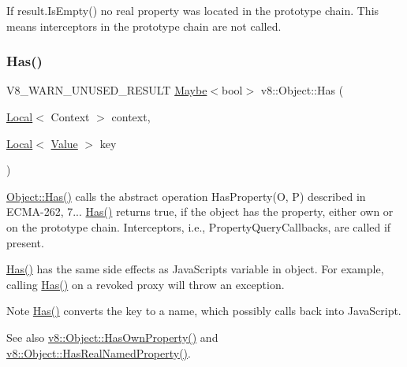 If result.\+Is\+Empty() no real property was located in the prototype chain. This means interceptors in the prototype chain are not called. \mbox{\label{classv8_1_1Object_a57d4819c2cc13715ed22dd23cdc84d7c}} 
\subsubsection{\texorpdfstring{Has()}{Has()}}
{\footnotesize\ttfamily V8\+\_\+\+W\+A\+R\+N\+\_\+\+U\+N\+U\+S\+E\+D\+\_\+\+R\+E\+S\+U\+LT \mbox{\hyperlink{classv8_1_1Maybe}{Maybe}}$<$bool$>$ v8\+::\+Object\+::\+Has (\begin{DoxyParamCaption}\item[{\mbox{\hyperlink{classv8_1_1Local}{Local}}$<$ Context $>$}]{context,  }\item[{\mbox{\hyperlink{classv8_1_1Local}{Local}}$<$ \mbox{\hyperlink{classv8_1_1Value}{Value}} $>$}]{key }\end{DoxyParamCaption})}

\mbox{\hyperlink{classv8_1_1Object_a57d4819c2cc13715ed22dd23cdc84d7c}{Object\+::\+Has()}} calls the abstract operation Has\+Property(\+O, P) described in E\+C\+M\+A-\/262, 7... \mbox{\hyperlink{classv8_1_1Object_a57d4819c2cc13715ed22dd23cdc84d7c}{Has()}} returns true, if the object has the property, either own or on the prototype chain. Interceptors, i.\+e., Property\+Query\+Callbacks, are called if present.

\mbox{\hyperlink{classv8_1_1Object_a57d4819c2cc13715ed22dd23cdc84d7c}{Has()}} has the same side effects as Java\+Script\textquotesingle{}s {\ttfamily variable in object}. For example, calling \mbox{\hyperlink{classv8_1_1Object_a57d4819c2cc13715ed22dd23cdc84d7c}{Has()}} on a revoked proxy will throw an exception.

\begin{DoxyNote}{Note}
\mbox{\hyperlink{classv8_1_1Object_a57d4819c2cc13715ed22dd23cdc84d7c}{Has()}} converts the key to a name, which possibly calls back into Java\+Script.
\end{DoxyNote}
See also \mbox{\hyperlink{classv8_1_1Object_acdd3921e95d5bb1a27cea489792607ff}{v8\+::\+Object\+::\+Has\+Own\+Property()}} and \mbox{\hyperlink{classv8_1_1Object_ad830b937c7586fe2086b288ea79935c4}{v8\+::\+Object\+::\+Has\+Real\+Named\+Property()}}. \mbox{\label{classv8_1_1Object_a278913bcd203434870ce5184a538a9af}} 

